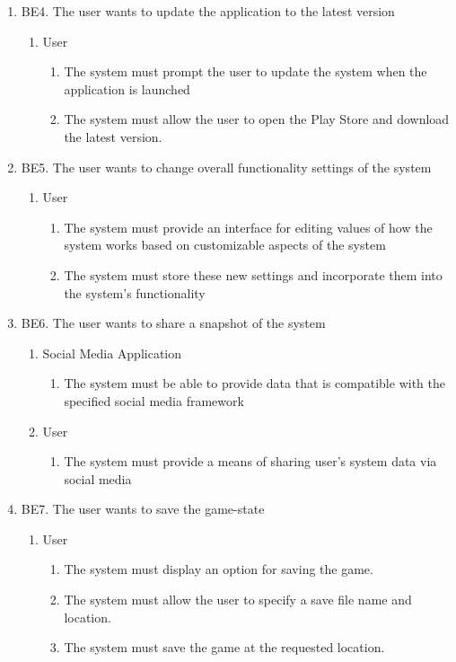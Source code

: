 \documentclass[]{article}
\begin{document}
\begin{enumerate}
	\item BE4. The user wants to update the application to the latest version
	\begin{enumerate}
		\item User
			\begin{enumerate}
				\item The system must prompt the user to update the system when the application is launched
				\item The system must allow the user to open the Play Store and download the latest version.
			\end{enumerate}
	\end{enumerate}
	\item BE5. The user wants to change overall functionality settings of the system
	\begin{enumerate}
		\item User
			\begin{enumerate}
				\item The system must provide an interface for editing values of how the system works based on customizable aspects of the system
				\item The system must store these new settings and incorporate them into the system’s functionality
			\end{enumerate}
	\end{enumerate}
	\item BE6. The user wants to share a snapshot of the system
	\begin{enumerate}
		\item Social Media Application
			\begin{enumerate}
				\item The system must be able to provide data that is compatible with the specified social media framework
			\end{enumerate}
			\item User
			\begin{enumerate}
				\item The system must provide a means of sharing user’s system data via social media
			\end{enumerate}
	\end{enumerate}
	\item BE7. The user wants to save the game-state
	\begin{enumerate}
		\item User
			\begin{enumerate}
				\item The system must display an option for saving the game.
				\item The system must allow the user to specify a save file name and location.
				\item The system must save the game at the requested location.
			\end{enumerate}
	\end{enumerate}
\end{enumerate}
\end{document}
